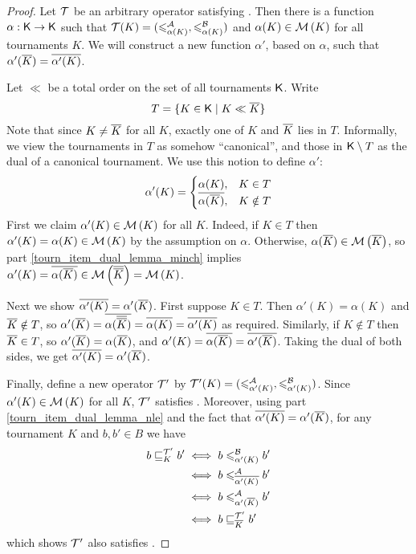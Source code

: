 \begin{proof}
    Let $\mathcal{T}$ be an arbitrary operator satisfying \chainmin{}. Then
    there is a function $\alpha: \mathsf{K} \to \mathsf{K}$ such that $\mathcal{T}(K) =
    ({\leqslant^{\mathcal{A}}_{\alpha(K)}}, {\leqslant^{\mathcal{B}}_{\alpha(K)}})$ and $\alpha(K) \in \operatorname{\mathcal{M}}\left({K}\right)$
    for all tournaments $K$. We will construct a new function $\alpha'$, based
    on $\alpha$, such that $\alpha'({\overline{K}}) = {\overline{\alpha'(K)}}$.

    Let $\ll$ be a total order on the set of all tournaments
    $\mathsf{K}$.\footnotemark{} Write
    \[
        T = \{K \in \mathsf{K} \mid K \ll {\overline{K}}\}
    \]
    Note that since $K \ne {\overline{K}}$ for all $K$, exactly one of $K$ and
    ${\overline{K}}$ lies in $T$. Informally, we view the tournaments in $T$ as
    somehow ``canonical'', and those in $\mathsf{K} \setminus T$ as the dual of a
    canonical tournament. We use this notion to define $\alpha'$:
    \[
        \alpha'(K) = \begin{cases}
            \alpha(K),& K \in T \\
            {\overline{\alpha({\overline{K}})}},& K \notin T
        \end{cases}
    \]
    First we claim $\alpha'(K) \in \operatorname{\mathcal{M}}\left({K}\right)$ for all $K$. Indeed, if $K \in T$
    then $\alpha'(K) = \alpha(K) \in \operatorname{\mathcal{M}}\left({K}\right)$ by the assumption on $\alpha$.
    Otherwise, $\alpha({\overline{K}}) \in \operatorname{\mathcal{M}}\left({{\overline{K}}}\right)$, so
     part \cref{tourn_item_dual_lemma_minch}
    implies $\alpha'(K) = {\overline{\alpha({\overline{K}})}} \in \operatorname{\mathcal{M}}\left({{\overline{{\overline{K}}}}}\right) =
    \operatorname{\mathcal{M}}\left({K}\right)$.

    Next we show ${\overline{\alpha'(K)}} = \alpha'({\overline{K}})$. First suppose $K \in
    T$. Then $\alpha'(K) = \alpha(K)$ and ${\overline{K}} \notin T$, so
    $\alpha'({\overline{K}}) = {\overline{\alpha({\overline{{\overline{K}}}})}} = {\overline{\alpha(K)}} =
    {\overline{\alpha'(K)}}$ as required. Similarly, if $K \notin T$ then ${\overline{K}}
    \in T$, so $\alpha'({\overline{K}}) = \alpha({\overline{K}})$, and $\alpha'(K) =
    {\overline{\alpha({\overline{K}})}} = {\overline{\alpha'({\overline{K}})}}$. Taking the dual of
    both sides, we get ${\overline{\alpha'(K)}} = \alpha'({\overline{K}})$.

    Finally, define a new operator $\mathcal{T}'$ by $\mathcal{T}'(K) =
    ({\leqslant^{\mathcal{A}}_{\alpha'(K)}}, {\leqslant^{\mathcal{B}}_{\alpha'(K)}})$. Since $\alpha'(K) \in
    \operatorname{\mathcal{M}}\left({K}\right)$ for all $K$, $\mathcal{T}'$ satisfies \chainmin{}. Moreover,
    using  part
    \cref{tourn_item_dual_lemma_nle} and the fact that ${\overline{\alpha'(K)}} =
    \alpha'({\overline{K}})$, for any tournament $K$ and $b, b' \in B$ we have
    \begin{align*}
        b \sqsubseteq_K^{\mathcal{T}'} b'
        &\iff b \leqslant^{\mathcal{B}}_{\alpha'(K)} b' \\
        &\iff b \leqslant^{\mathcal{A}}_{{\overline{\alpha'(K)}}} b' \\
        &\iff b \leqslant^{\mathcal{A}}_{\alpha'({\overline{K}})} b' \\
        &\iff b \sqsubseteq_{{\overline{K}}}^{\mathcal{T}'} b'
    \end{align*}
    which shows $\mathcal{T}'$ also satisfies \dualaxiom{}.
\end{proof}

